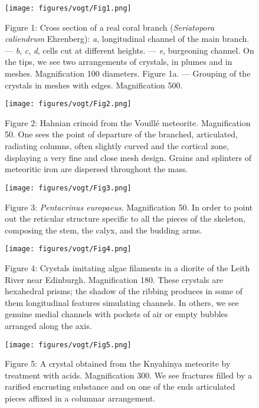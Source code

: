 \documentclass[a4paper, 12pt, oneside]{article}
\begin{document}
\clearpage
\pagestyle{fancy}
\fancyhf{}
\cfoot{\thepage}
\begin{figure}[b]
\texttt{[image: figures/vogt/Fig1.png]}
\caption{Figure 1: Cross section of a real coral branch (\emph{Seriatopora caliendrum} Ehrenberg): \emph{a}, longitudinal channel of the main branch. --- \emph{b}, \emph{c}, \emph{d}, cells cut at different heights. --- \emph{e}, burgeoning channel. On the tips, we see two arrangements of crystals, in plumes and in meshes. Magnification 100 diameters. Figure 1a. --- Grouping of the crystals in meshes with edges. Magnification 500.}
\centering
\end{figure}
\clearpage
\begin{figure}[b]
\texttt{[image: figures/vogt/Fig2.png]}
\caption{Figure 2: Hahnian crinoid from the Vouillé meteorite. Magnification 50. One sees the point of departure of the branched, articulated, radiating columns, often slightly curved and the cortical zone, displaying a very fine and close mesh design. Grains and splinters of meteoritic iron are dispersed throughout the mass.}
\centering
\end{figure}
\clearpage
\begin{figure}[b]
\texttt{[image: figures/vogt/Fig3.png]}
\caption{Figure 3: \emph{Pentacrinus europaeus}. Magnification 50. In order to point out the reticular structure specific to all the pieces of the skeleton, composing the stem, the calyx, and the budding arms.}
\centering
\end{figure}
\clearpage
\begin{figure}[b]
\texttt{[image: figures/vogt/Fig4.png]}
\caption{Figure 4: Crystals imitating algae filaments in a diorite of the Leith River near Edinburgh. Magnification 180. These crystals are hexahedral prisms; the shadow of the ribbing produces in some of them longitudinal features simulating channels. In others, we see genuine medial channels with pockets of air or empty bubbles arranged along the axis.}
\centering
\end{figure}
\clearpage
\begin{figure}[b]
\centering
\texttt{[image: figures/vogt/Fig5.png]}
\caption{Figure 5: A crystal obtained from the Knyahinya meteorite by treatment with acids. Magnification 300. We see fractures filled by a rarified encrusting substance and on one of the ends articulated pieces affixed in a columnar arrangement.}
\end{figure}
\end{document}
